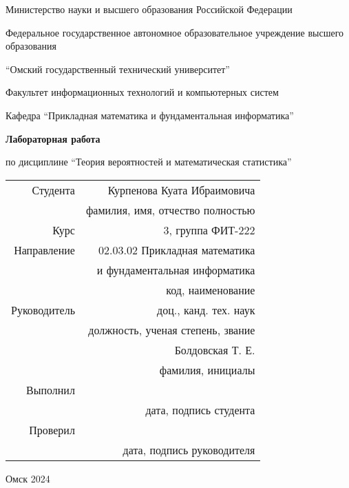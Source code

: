\thispagestyle{empty}

\begin{center}
    Министерство науки и высшего образования Российской Федерации

    Федеральное государственное автономное образовательное учреждение высшего образования

    \enquote{Омский государственный технический университет}

    \vspace{1cm}
    Факультет информационных технологий и компьютерных систем

    Кафедра \enquote{Прикладная математика и фундаментальная информатика}

    \vspace{4cm}
    \textbf{Лабораторная работа}

    по дисциплине \enquote{Теория вероятностей и математическая статистика}
\end{center}

\vspace{2cm}
\begin{flushright}    
    \begin{tabular}{ r r }
        Студента & Курпенова Куата Ибраимовича \\
        \cline{2-2}
        & \tiny{фамилия, имя, отчество полностью} \\

        Курс & 3, группа ФИТ-222 \\
        \cline{2-2}
        Направление & 02.03.02 Прикладная математика \\
        \cline{2-2}
        & и фундаментальная информатика \\
        \cline{2-2}
        & \tiny{код, наименование} \\

        Руководитель & доц., канд. тех. наук \\
        \cline{2-2}
        & \tiny{должность, ученая степень, звание} \\
        & Болдовская Т. Е. \\
        \cline{2-2}
        & \tiny{фамилия, инициалы} \\

        Выполнил & \\
        \cline{2-2}
        & \tiny{дата, подпись студента} \\

        Проверил & \\
        \cline{2-2}
        & \tiny{дата, подпись руководителя} \\

    \end{tabular}
\end{flushright}

\vspace*{\fill}
\begin{center}
    Омск 2024
\end{center}
